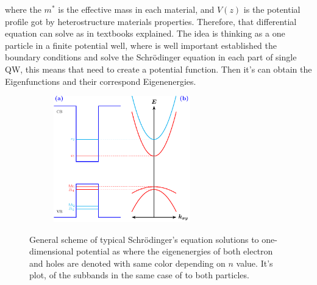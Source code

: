 where the $m^{*}$ is the effective mass in each material, and $V(z)$ is the potential profile got by heterostructure materials properties. Therefore, that differential equation can solve as in textbooks explained\cite{de2014introduccion,griffiths2018introduction,sakurai1995modern,cohen2019quantum,chuang1995physics,harrison2016quantum,fox2002optical,bastard1990wave}. The idea is thinking as a one particle in a finite potential well, where is well important established the boundary conditions and solve the Schrödinger equation in each part of single QW, this means that need to create a potential function. Then it's can obtain the Eigenfunctions and their correspond Eigenenergies.

\begin{figure}
	\begin{subfigure}{\textwidth}
		\centering
		\includegraphics[width=0.65\textwidth]{../figures/chapter-1/heterostructures/out/qw2}
		\label{subfig:subsection-1.2-single-quantum-well-scheme2-a)}
		\label{subfig:subsection-1.2-single-quantum-well-scheme2-b)}
	\end{subfigure}
	\caption{General scheme of typical Schrödinger's equation solutions to one-dimensional potential as  where the eigenenergies of both electron and holes are denoted with same color depending on  $n$ value. It's plot, of the subbands in  the same case of   to both particles.  }
	\label{fig:subsection-1.2-single-quantum-well-scheme2}
\end{figure}

